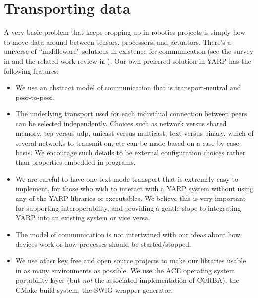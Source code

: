
\setlength{\doublerulesep}{\arrayrulewidth}



\section{Transporting data}

A very basic problem that keeps cropping up in robotics projects is
simply how to move data around between sensors, processors,
and actuators.  There's a universe of ``middleware'' solutions
in existence for communication (see the survey in \cite{kramer2007development}
and the related work review in \cite{collett2005player}).
%
%
Our own preferred solution
in YARP has the following features:

\begin{itemize} \pflist

\item We use an abstract model of communication that is
transport-neutral and peer-to-peer.

\item The underlying transport used for each individual connection
between peers can be selected independently.  Choices such as network
versus shared memory, tcp versus udp, unicast versus multicast, text
versus binary, which of several networks to transmit on, etc can be
made based on a case by case basis.  We encourage such details to be
external configuration choices rather than properties embedded in
programs.

\item We are careful to have one text-mode transport that is
extremely easy to implement, for those who wish to interact with a
YARP system without using any of the YARP libraries or executables.
We believe this is very important for supporting interoperability, and
providing a gentle slope to integrating YARP into an existing system
or vice versa.

\item The model of communication is not intertwined with our
ideas about how devices work or how processes should be started/stopped.

\item We use other key free and open source projects to make
our libraries usable in as many environments as possible.  We use the
ACE operating system portability layer (but {\it not} the associated
implementation of CORBA), the CMake build system, the SWIG wrapper
generator.

\end{itemize}


